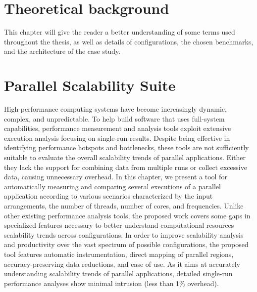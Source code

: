 \documentclass[
papersize=a4,
pagelayout=default,
fontname=latinmodern,
fontsize=11pt,
twoside,
final,
faculty=fpms,
]{umons-Thesis}
\begin{document}
	\chapter{Theoretical background} \label{chapter:theoretical_background}
	This chapter will give the reader a better understanding of some terms used throughout the thesis, as well as details of configurations, the chosen benchmarks, and the architecture of the case study.
	
	
	\chapter{Parallel Scalability Suite} \label{chapter:pascal_suite}
	High-performance computing systems have become increasingly dynamic, complex, and unpredictable. To help build software that uses full-system capabilities, performance measurement and analysis tools exploit extensive execution analysis focusing on single-run results. Despite being effective in identifying performance hotspots and bottlenecks, these tools are not sufficiently suitable to evaluate the overall scalability trends of parallel applications. Either they lack the support for combining data from multiple runs or collect excessive data, causing unnecessary overhead. 
	In this chapter, we present a tool for automatically measuring and comparing several executions of a parallel application according to various scenarios characterized by the input arrangements, the number of threads, number of cores, and frequencies.
	Unlike other existing performance analysis tools, the proposed work covers some gaps in specialized features necessary to better understand computational resources scalability trends across configurations.
	In order to improve scalability analysis and productivity over the vast spectrum of possible configurations, the proposed tool features automatic instrumentation, direct mapping of parallel regions, accuracy-preserving data reductions, and ease of use.
	As it aims at accurately understanding scalability trends of parallel applications, detailed single-run performance analyses show minimal intrusion (less than 1\% overhead).
	
	
	
	
	
\end{document}
